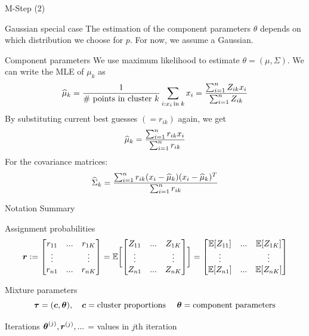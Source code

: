 \documentclass[10pt]{beamer}
\newcommand{\Assign}{Z}
\newcommand{\soft}{r} %
\begin{document}
\begin{frame}{M-Step (2)}
\footnotesize
\begin{sblock}{Gaussian special case}
The estimation of the component parameters $\theta$ depends on which distribution we choose for $p$.  For now, we assume a Gaussian. 
\end{sblock}
\begin{sblock}{Component parameters}
We use maximum likelihood to estimate $\theta=(\mu, \Sigma)$.  We can write the MLE of $\mu_k$ as 
\[ \widehat{\mu}_k =  \df{1}{\text{\# points in cluster } k}  \ds\sum_{i : x_i \, \text{in} \; k} x_i = \df{\sum_{i=1}^n  \Assign_{ik} x_i} {\sum_{i=1}^n \Assign_{ik}}\]
By substituting current best guesses $(=\soft_{ik})$ again, we get
\[ \widehat{\mu}_k = \df{\sum_{i=1}^n  \soft_{ik} x_i}{\sum_{i=1}^n \soft_{ik}}\]
For the covariance matrices:
\[ \widehat{\Sigma}_k = \df{ \sum_{i=1}^n \soft_{ik} (x_i - \widehat{\mu}_k ) (x_i - \widehat{\mu}_k )^T }{ \sum_{i=1}^n \soft_{ik}} \]
\end{sblock}
\end{frame}

\begin{frame}{Notation Summary}
\begin{sblock}{Assignment probabilities}
\[ 
 \+\soft := 
\begin{bmatrix}
\soft_{11} & ... & \soft_{1K}\\
\vdots & & \vdots \\
\soft_{n1} & ... &  \soft_{nK}\\
\end{bmatrix} 
= \E \bb{
\begin{bmatrix}
\Assign_{11} & ... & \Assign_{1K}\\
\vdots & & \vdots \\
\Assign_{n1} & ... &  \Assign_{nK}\\
\end{bmatrix} 
} =
\begin{bmatrix}
\E[\Assign_{11}] & ... & \E[\Assign_{1K}]\\
\vdots & & \vdots \\
\E[\Assign_{n1}] & ... &  \E[\Assign_{nK}]\\
\end{bmatrix} 
 \]
 
\end{sblock}
\begin{sblock}{Mixture parameters}
\[ {\boldsymbol \tau} = ({\boldsymbol c}, {\boldsymbol \theta}), \quad {\boldsymbol c} = \text{cluster proportions } \quad {\boldsymbol \theta} = \text{component parameters} \]
\end{sblock}
\begin{sblock}{Iterations}
$\+\theta^{(j)}, \+\soft^{(j)}, ...$ = values in $j$th iteration 
\end{sblock}
\end{frame}
\end{document}
